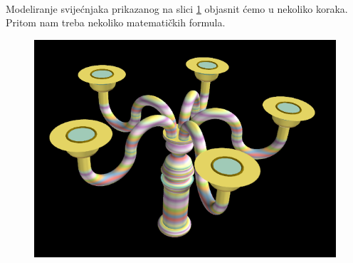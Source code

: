 \documentclass[a4paper,12pt]{article}
\theoremstyle{zad}
\begin{document}
\begin{center}
\\[2pt]
\end{center}
\noindent Modeliranje svije\'cnjaka prikazanog na slici \ref{slika1} objasnit \'cemo u nekoliko koraka. Pritom nam treba nekoliko matemati\v{c}kih formula.\par\vspace*{5pt}
\begin{figure}[!h]
\centering
\includegraphics[scale=0.25]{slika1.png}
\vspace*{-10pt}
\caption{}
\label{slika1}
\end{figure}
\end{document}
